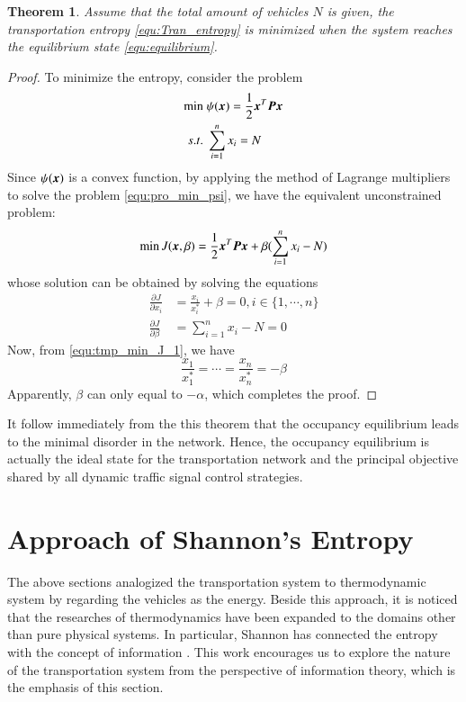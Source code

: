 \documentclass[preprint,authoryear,12pt]{elsarticle}
\renewcommand{\vec}[1]{\mbox{\boldmath$#1$}}
\newcommand{\mat}[1]{\mbox{\boldmath$#1$}}
\newtheorem{thm}{Theorem}
\begin{document}

\begin{thm}\label{thm:entropy_equilibrium}
Assume that the total amount of vehicles $N$ is given, the transportation entropy \eqref{equ:Tran_entropy} is minimized when the system reaches the equilibrium state \eqref{equ:equilibrium}.
\end{thm}
\begin{proof}
To minimize the entropy, consider the problem
\begin{align}\label{equ:pro_min_psi}
\min\; &\psi(\vec{x}) = \frac{1}{2}\vec{x}^T\mat{P}\vec{x}\\
s.t.\; &\sum_{i=1}^n x_i = N \nonumber
\end{align}
Since $\psi(\vec{x})$ is a convex function, by applying the method of Lagrange multipliers to solve the problem \eqref{equ:pro_min_psi}, we have the equivalent unconstrained problem:
$$\min J(\vec{x},\beta) =
\frac{1}{2}\vec{x}^T\mat{P}\vec{x}+\beta(\sum_{i=1}^n x_i - N)$$
whose solution can be obtained by solving the equations
\begin{align}
\label{equ:tmp_min_J_1}
\frac{\partial J}{\partial x_i} &= \frac{x_i}{x_i^*}+\beta =0,
i\in\{1,\cdots,n\}\\
\label{equ:tmp_min_J_2}
\frac{\partial J}{\partial \beta} &= \sum_{i=1}^n x_i - N =0
\end{align}
Now, from \eqref{equ:tmp_min_J_1}, we have
$$\frac{x_1}{x_1^*}=\cdots=\frac{x_n}{x_n^*}=-\beta
$$
Apparently, $\beta$ can only equal to $-\alpha$, which completes the proof.
\end{proof}

It follow immediately from the this theorem that the occupancy equilibrium leads to the minimal disorder in the network. Hence, the occupancy equilibrium is actually the ideal state for the transportation network and the principal objective shared by all dynamic traffic signal control strategies.

\section{Approach of Shannon's Entropy}

The above sections analogized the transportation system to thermodynamic system by regarding the vehicles as the energy. Beside this approach, it is noticed that the researches of thermodynamics have been expanded to the domains other than pure physical systems. In particular, Shannon has connected the entropy with the concept of information \citep{Shannon1948}. This work encourages us to explore the nature of the transportation system from the perspective of information theory, which is the emphasis of this section.
\end{document}
